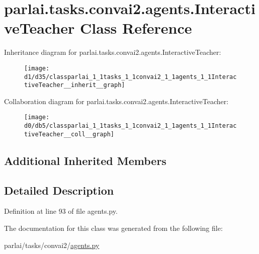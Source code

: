\hypertarget{classparlai_1_1tasks_1_1convai2_1_1agents_1_1InteractiveTeacher}{}\section{parlai.\+tasks.\+convai2.\+agents.\+Interactive\+Teacher Class Reference}
\label{classparlai_1_1tasks_1_1convai2_1_1agents_1_1InteractiveTeacher}


Inheritance diagram for parlai.\+tasks.\+convai2.\+agents.\+Interactive\+Teacher\+:\nopagebreak
\begin{figure}[H]
\begin{center}
\leavevmode
\texttt{[image: d1/d35/classparlai\_1\_1tasks\_1\_1convai2\_1\_1agents\_1\_1InteractiveTeacher\_\_inherit\_\_graph]}
\end{center}
\end{figure}


Collaboration diagram for parlai.\+tasks.\+convai2.\+agents.\+Interactive\+Teacher\+:\nopagebreak
\begin{figure}[H]
\begin{center}
\leavevmode
\texttt{[image: d0/db5/classparlai\_1\_1tasks\_1\_1convai2\_1\_1agents\_1\_1InteractiveTeacher\_\_coll\_\_graph]}
\end{center}
\end{figure}
\subsection*{Additional Inherited Members}


\subsection{Detailed Description}


Definition at line 93 of file agents.\+py.



The documentation for this class was generated from the following file\+:\begin{DoxyCompactItemize}
\item 
parlai/tasks/convai2/\hyperlink{parlai_2tasks_2convai2_2agents_8py}{agents.\+py}\end{DoxyCompactItemize}
